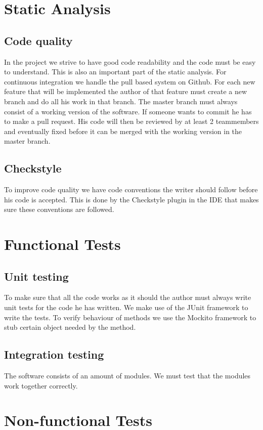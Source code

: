 \documentclass[a4paper]{article}
\begin{document}
\section{Static Analysis}

\subsection{Code quality}
In the project we strive to have good code readability and the code must be easy
to understand. This is also an important part of the static analysis. For
continuous integration we handle the pull based system on Github. For each new
feature that will be implemented the author of that feature must create a new
branch and do all his work in that branch. The master branch must always consist
of a working version of the software. If someone wants to commit he has to
make a pull request. His code will then be reviewed by at least 2
teammembers and eventually fixed before it can be merged with the working
version in the master branch.

\subsection{Checkstyle}
To improve code quality we have code conventions the writer should follow before
his code is accepted. This is done by the Checkstyle plugin in the IDE that makes
sure these conventions are followed.

\section{Functional Tests}


\subsection{Unit testing}
To make sure that all the code works as it should the author must always write
unit tests for the code he has written. We make use of the JUnit framework to
write the tests. To verify behaviour of methods we use the Mockito framework to
stub certain object needed by the method.

\subsection{Integration testing}
The software consists of an amount of modules. We must test that the modules
work together correctly.

\section{Non-functional Tests}
\end{document}
